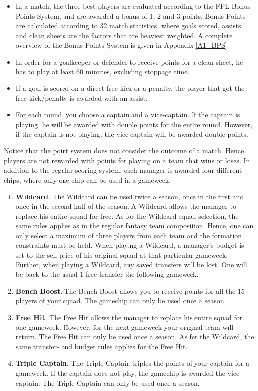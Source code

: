 \begin{itemize}
    \item In a match, the three best players are evaluated according to the FPL Bonus Points System, and are awarded a bonus of 1, 2 and 3 points. Bonus Points are calculated according to 32 match statistics, where goals scored, assists and clean sheets are the factors that are heaviest weighted. A complete overview of the Bonus Points System is given in Appendix \ref{A1_BPS}
    \item In order for a goalkeeper or defender to receive points for a clean sheet, he has to play at least 60 minutes, excluding stoppage time. 
    \item If a goal is scored on a direct free kick or a penalty, the player that got the free kick/penalty is awarded with an assist. 
    \item For each round, you choose a captain and a vice-captain. If the captain is playing, he will be awarded with double points for the entire round. However, if the captain is not playing, the vice-captain will be awarded double points. 
\end{itemize}
Notice that the point system does not consider the outcome of a match. Hence, players are not rewarded with points for playing on a team that wins or loses. 
\newpar
In addition to the regular scoring system, each manager is awarded four different chips, where only one chip can be used in a gameweek: 
\begin{enumerate} [label=(\roman*)]

\item \textbf{Wildcard}. The Wildcard can be used twice a season, once in the first and once in the second half of the season. A Wildcard allows the manager to replace his entire squad for free. As for the Wildcard squad selection, the same rules applies as in the regular fantasy team composition. Hence, one can only select a maximum of three players from each team and the formation constraints must be held. When playing a Wildcard, a manager's budget is set to the sell price of his original squad at that particular gameweek. Further, when playing a Wildcard, any saved transfers will be lost. One will be back to the usual 1 free transfer the following gameweek.

\item \textbf{Bench Boost}. The Bench Boost allows you to receive points for all the 15 players of your squad. The gamechip can only be used once a season. 

\item \textbf{Free Hit}. The Free Hit allows the manager to replace his entire squad for one gameweek. However, for the next gameweek your original team will return.  The Free Hit can only be used once a season. As for the Wildcard, the same transfer- and budget rules applies for the Free Hit.

\item \textbf{Triple Captain}. The Triple Captain triples the points of your captain for a gameweek. If the captain does not play, the gamechip is awarded the vice-captain. The Triple Captain can only be used once a season. 
\end{enumerate}

